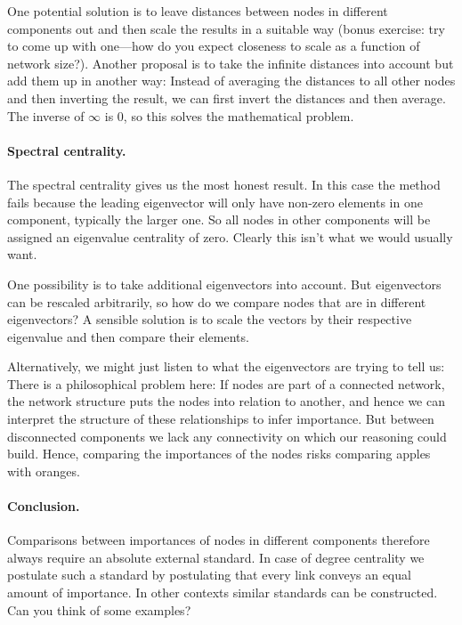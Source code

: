One potential solution is to leave distances between nodes in different components out and then scale the results in a suitable way (bonus exercise: try to come up with one---how do you expect closeness to scale as a function of network size?). Another proposal is to take the infinite distances into account but add them up in another way: Instead of averaging the distances to all other nodes and then inverting the result, we can first invert the distances and then average. The inverse of $\infty$ is $0$, so this solves the mathematical problem. 

\paragraph{Spectral centrality.}The spectral centrality gives us the most honest result. In this case the method fails because the leading eigenvector will only have non-zero elements in one component, typically the larger one. So all nodes in other components will be assigned an eigenvalue centrality of zero. Clearly this isn't what we would usually want. 

One possibility is to take additional eigenvectors into account. But eigenvectors can be rescaled arbitrarily, so how do we compare nodes that are in different eigenvectors?  A sensible solution is to scale the vectors by their respective eigenvalue and then compare their elements. 

Alternatively, we might just listen to what the eigenvectors are trying to tell us: There is a philosophical problem here: If nodes are part of a connected network, the network structure puts the nodes into relation to another, and hence we can interpret the structure of these relationships to infer importance. But between disconnected components we lack any connectivity on which our reasoning could build. Hence, comparing the importances of the nodes risks comparing apples with oranges. 

\paragraph{Conclusion.}Comparisons between importances of nodes in different components therefore always require an absolute external standard. In case of degree centrality we postulate such a standard by postulating that every link conveys an equal amount of importance. In other contexts similar standards can be constructed. Can you think of some examples?













